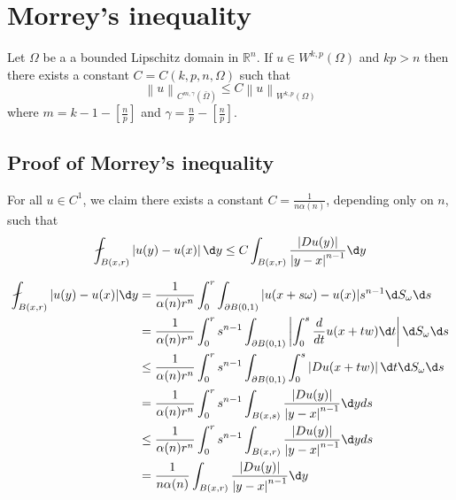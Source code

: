 \section{Morrey's inequality}
\begin{theorem}
    Let $\Omega$ be a a bounded Lipschitz domain in $\mathbb{R}^n$.
    If $u \in W^{k, p}\left(\Omega\right)$ and $kp>n$
    then there exists a constant $C=C\left(k,p,n,\Omega\right)$ such that
    \begin{equation*}
        \left\|u\right\|_{C^{m, \gamma}(\bar{\Omega})} \leq C\left\|u\right\|_{W^{k, p}\left(\Omega\right)}
    \end{equation*}
    where $m=k-1-\left[\frac{n}{p}\right]$ and $\gamma=\frac{n}{p}-\left[\frac{n}{p}\right]$.
\end{theorem}

\subsection{Proof of Morrey's inequality}
\begin{lemma}
    For all $u\in C^1$, we claim there exists a constant $C=\frac{1}{n \alpha(n)}$, depending only on $n$, such that
    \begin{equation*}
        \fint_{B(x,r)} \left|u(y)-u(x)\right| \d  y
        \leq
        C \int_{B(x,r)} \frac{\left|D u(y)\right| }{\left|y-x\right|^{n-1}}\d y
    \end{equation*}

    \begin{equation*}
        \begin{aligned}
            \fint_{B(x,r)} |u(y)-u(x)| \d  y &
            = \frac{1}{\alpha(n)r^n}\int_0^r \int_{\partial B(0,1)} |u(x + s \omega )-u(x)| s^{n-1} \d S_\omega \d s                                                                \\
                                             & = \frac{1}{\alpha(n)r^n}\int_0^r s^{n-1}\int_{\partial B(0,1)} \left|\int_0^s \frac{d}{d t} u(x+t w) \d  t\right|   \d S_\omega \d s \\
                                             & \leq \frac{1}{\alpha(n)r^n} \int_0^r s^{n-1} \int_{\partial B(0,1)} \int_0^s  \left|D u(x+t w)\right|   \d t \d S_\omega \d s        \\
                                             & = \frac{1}{\alpha(n)r^n}\int_0^r s^{n-1} \int_{B(x,s)} \frac{\left|D u(y)\right| }{\left|y-x\right|^{n-1}}\d y ds                    \\
                                             & \leq \frac{1}{\alpha(n)r^n}\int_0^r s^{n-1} \int_{B(x,r)} \frac{\left|D u(y)\right| }{\left|y-x\right|^{n-1}}\d y ds                 \\
                                             & = \frac{1}{n \alpha(n)} \int_{B(x,r)} \frac{\left|D u(y)\right| }{\left|y-x\right|^{n-1}}\d y
        \end{aligned}
    \end{equation*}
\end{lemma}

